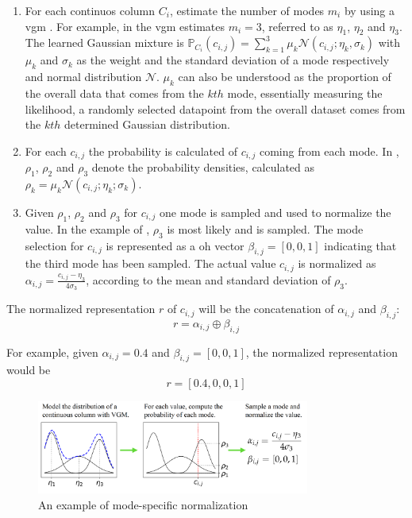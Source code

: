 \begin{enumerate}
    \item For each continuos column $C_i$, estimate the number of modes $m_i$ by using a \gls{vgm} \cite{bishop2006PatternRecognitionMachine}. 
    For example, in  the \gls{vgm} estimates $m_i=3$, referred to as $\eta_1$, $\eta_2$ and $\eta_3$. 
    The learned Gaussian mixture is  
    $\mathbb{P}_{C_i}(c_{i,j})=\sum_{k=1}^{3}\mu_k\mathcal{N}(c_{i,j};\eta_k, \sigma_k)$
    with $\mu_k$ and $\sigma_k$ as the weight and the standard deviation of a mode respectively and normal distribution $\mathcal{N}$.
    $\mu_k$ can also be understood as the proportion of the overall data that comes from the $kth$ mode, essentially measuring the likelihood, a randomly selected datapoint from the overall dataset comes from the $kth$ determined Gaussian distribution.
    \item For each $c_{i,j}$ the probability is calculated of $c_{i,j}$ coming from each mode. 
    In , $\rho_1$, $\rho_2$ and $\rho_3$ denote the probability densities, calculated as $\rho_k=\mu_k\mathcal{N}(c_{i,j};\eta_k;\sigma_k)$.
    \item Given $\rho_1$, $\rho_2$ and $\rho_3$ for $c_{i,j}$ one mode is sampled and used to normalize the value. 
    In the example of , $\rho_3$ is most likely and is sampled.
    The mode selection for $c_{i,j}$ is represented as a \gls{oh} vector $\beta_{i,j}=[0,0,1]$ indicating that the third mode has been sampled.
    The actual value $c_{i,j}$ is normalized as $\alpha_{i,j}=\frac{c_{i,j}-\eta_3}{4\sigma_3}$, according to the mean and standard deviation of $\rho_3$. 
\end{enumerate}

The normalized representation $r$ of $c_{i,j}$ will be the concatenation of $\alpha_{i,j}$ and $\beta_{i,j}$: 
$$r=\alpha_{i,j}\oplus\beta_{i,j}$$

For example, given $\alpha_{i,j}=0.4$ and $\beta_{i,j}=[0,0,1]$, the normalized representation would be $$r=[0.4,0,0,1]$$

\begin{figure}[h]
    \centering
    \includegraphics[width=0.8\textwidth]{images/mode-normalization.png}
    \caption[Mode-Specific Normalization]{An example of mode-specific normalization \cite[Figure 1, p. 4]{xu2019ModelingTabularData}}
    \label{fig:mode-specific-normalization}
\end{figure}

